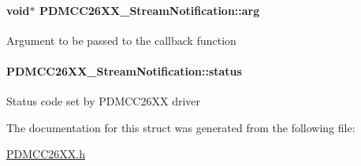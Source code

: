 \paragraph[{arg}]{\setlength{\rightskip}{0pt plus 5cm}void$\ast$ P\+D\+M\+C\+C26\+X\+X\+\_\+\+Stream\+Notification\+::arg}\label{struct_p_d_m_c_c26_x_x___stream_notification_ab21bcd11c6d72c08354643d6022cbb5e}
Argument to be passed to the callback function 
\paragraph[{status}]{ P\+D\+M\+C\+C26\+X\+X\+\_\+\+Stream\+Notification\+::status}\label{struct_p_d_m_c_c26_x_x___stream_notification_a57a4fc3f0b7fc1ff267b164cafff063c}
Status code set by P\+D\+M\+C\+C26\+X\+X driver 

The documentation for this struct was generated from the following file\+:\begin{DoxyCompactItemize}
\item 
\hyperlink{_p_d_m_c_c26_x_x_8h}{P\+D\+M\+C\+C26\+X\+X.\+h}\end{DoxyCompactItemize}
